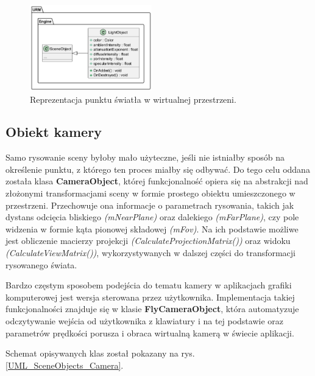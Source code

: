 	\begin{figure}[h!]
		\centering
		\includegraphics[width=200px]{images/UML/sceneobjects_light.png}
		\caption{Reprezentacja punktu światła w wirtualnej przestrzeni.}
		\label{UML_SceneObjects_Light}
	\end{figure}
	
\subsection{Obiekt kamery}
	Samo rysowanie sceny byłoby mało użyteczne, jeśli nie istniałby sposób na określenie punktu, z którego ten proces miałby się odbywać. Do tego celu oddana została klasa \textbf{CameraObject}, której funkcjonalność opiera się na abstrakcji nad złożonymi transformacjami sceny w formie prostego obiektu umieszczonego w przestrzeni. Przechowuje ona informacje o parametrach rysowania, takich jak dystans odcięcia bliskiego \textit{(mNearPlane)} oraz dalekiego \textit{(mFarPlane)}, czy pole widzenia w formie kąta pionowej składowej \textit{(mFov)}. Na ich podstawie możliwe jest obliczenie macierzy projekcji \textit{(CalculateProjectionMatrix())} oraz widoku \textit{(CalculateViewMatrix())}, wykorzystywanych w dalszej części do transformacji rysowanego świata.
	
	Bardzo częstym sposobem podejścia do tematu kamery w aplikacjach grafiki komputerowej jest wersja sterowana przez użytkownika. Implementacja takiej funkcjonalności znajduje się w klasie \textbf{FlyCameraObject}, która automatyzuje odczytywanie wejścia od użytkownika z klawiatury i na tej podstawie oraz parametrów prędkości porusza i obraca wirtualną kamerą w świecie aplikacji.
	
	Schemat opisywanych klas został pokazany na rys. \ref{UML_SceneObjects_Camera}.
	
